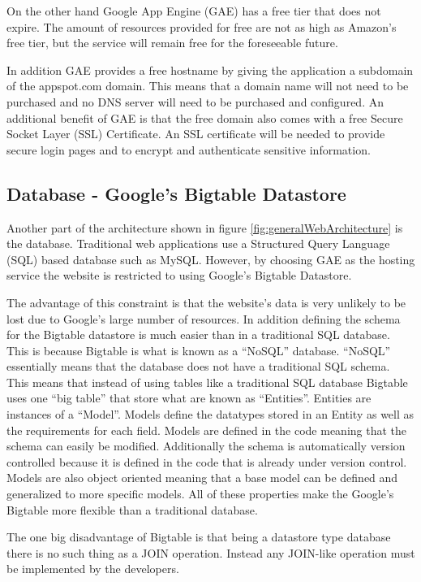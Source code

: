\documentclass{article}
\begin{document}
On the other hand Google App Engine (GAE) has a free tier that does not expire. The amount of resources provided for free are not as high as Amazon's free tier, but the service will remain free for the foreseeable future.  \cite{google_quotas_2012} 

In addition GAE provides a free hostname by giving the application a subdomain of the appspot.com domain. This means
that a domain name will not need to be purchased and no DNS server will need to be purchased and configured.
An additional benefit of GAE is that the free domain also comes with a free Secure Socket Layer (SSL) Certificate. An SSL 
certificate will be needed to provide secure login pages and to encrypt and authenticate sensitive information.

\subsection{Database - Google's Bigtable Datastore}

Another part of the architecture shown in figure \ref{fig:generalWebArchitecture} is the database. Traditional web
applications use a Structured Query Language (SQL) based database such as MySQL. However, by choosing GAE as the hosting service the website
is restricted to using Google's Bigtable Datastore.

The advantage of this constraint is that the website's data is very unlikely to be lost due to Google's large number
of resources. In addition defining the schema for the Bigtable datastore is much easier than in a traditional SQL database.
This is because Bigtable is what is known as a ``NoSQL'' database. \cite{google_how_2012} ``NoSQL'' essentially means that the database does not have a traditional SQL schema. This means that instead of using tables like a traditional
SQL database Bigtable uses one ``big table'' that store what are known as ``Entities''. Entities are instances of a ``Model''. Models define the datatypes stored in an Entity as well as the requirements for each field. Models are defined in the code meaning that
the schema can easily be modified. Additionally the schema is automatically version controlled because it is defined in the
code that is already under version control. Models are also object oriented meaning that a base model can be defined and
generalized to more specific models. All of these properties make the Google's Bigtable more flexible than a traditional
database.

The one big disadvantage of Bigtable is that being a datastore type database there is no such thing as a JOIN operation. 
Instead any JOIN-like operation must be implemented by the developers.
\end{document}
